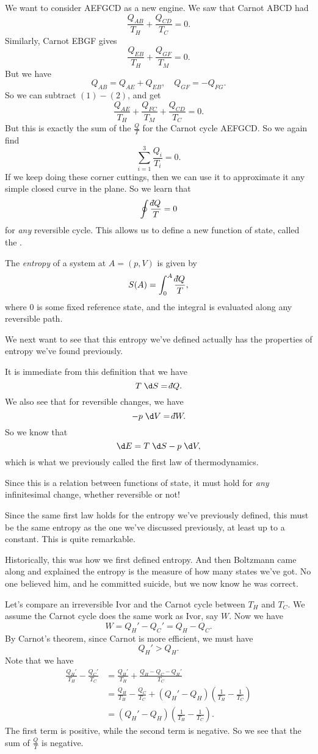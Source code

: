 \documentclass[a4paper]{article}
\def\di{{\mathchar'26\mkern-12mu d}}
\begin{document}
We want to consider AEFGCD as a new engine. We saw that Carnot ABCD had
\[
  \frac{Q_{AB}}{T_H} + \frac{Q_{CD}}{T_C} = 0.\tag{$1$}
\]
Similarly, Carnot EBGF gives
\[
  \frac{Q_{EB}}{T_H} + \frac{Q_{GF}}{T_M} = 0.\tag{$2$}
\]
But we have
\[
  Q_{AB} = Q_{AE} + Q_{EB},\quad Q_{GF} = - Q_{FG}.
\]
So we can subtract $(1) - (2)$, and get
\[
  \frac{Q_{AE}}{T_H} + \frac{Q_{FC}}{T_M} + \frac{Q_{CD}}{T_C} = 0.
\]
But this is exactly the sum of the $\frac{Q}{T}$ for the Carnot cycle AEFGCD. So we again find
\[
  \sum_{i = 1}^3 \frac{Q_i}{T_i} = 0.
\]
If we keep doing these corner cuttings, then we can use it to approximate it any simple closed curve in the plane. So we learn that
\[
  \oint \frac{\di Q}{T} = 0
\]
for \emph{any} reversible cycle. This allows us to define a new function of state, called the .
\begin{defi}[Entropy]
  The \emph{entropy} of a system at $A = (p, V)$ is given by
  \[
    S(A) =\int_0^A \frac{\di Q}{T},
  \]
  where $0$ is some fixed reference state, and the integral is evaluated along any reversible path.
\end{defi}
We next want to see that this entropy we've defined actually has the properties of entropy we've found previously.

It is immediate from this definition that we have
\[
  T\;\d S = \di Q.
\]
We also see that for reversible changes, we have
\[
  -p \;\d V = \di W.
\]
So we know that
\[
  \d E = T\;\d S - p \;\d V,
\]
which is what we previously called the first law of thermodynamics.

Since this is a relation between functions of state, it must hold for \emph{any} infinitesimal change, whether reversible or not!

Since the same first law holds for the entropy we've previously defined, this must be the same entropy as the one we've discussed previously, at least up to a constant. This is quite remarkable.

Historically, this was how we first defined entropy. And then Boltzmann came along and explained the entropy is the measure of how many states we've got. No one believed him, and he committed suicide, but we now know he was correct.

Let's compare an irreversible Ivor and the Carnot cycle between $T_H$ and $T_C$. We assume the Carnot cycle does the same work as Ivor, say $W$. Now we have
\[
  W = Q_H' - Q_C'= Q_H - Q_C.
\]
By Carnot's theorem, since Carnot is more efficient, we must have
\[
  Q_H' > Q_H.
\]
Note that we have
\begin{align*}
  \frac{Q_H'}{T_H} - \frac{Q_C'}{T_C} &= \frac{Q_H'}{T_H} + \frac{Q_H - Q_C - Q_H'}{T_C} \\
  &= \frac{Q_H}{T_H} - \frac{Q_C}{T_C} + (Q_H' - Q_H)\left(\frac{1}{T_H} - \frac{1}{T_C}\right) \\
  &= (Q_H' - Q_H)\left(\frac{1}{T_H} - \frac{1}{T_C}\right).
\end{align*}
The first term is positive, while the second term is negative. So we see that the sum of $\frac{Q}{T}$ is negative.
\end{document}
